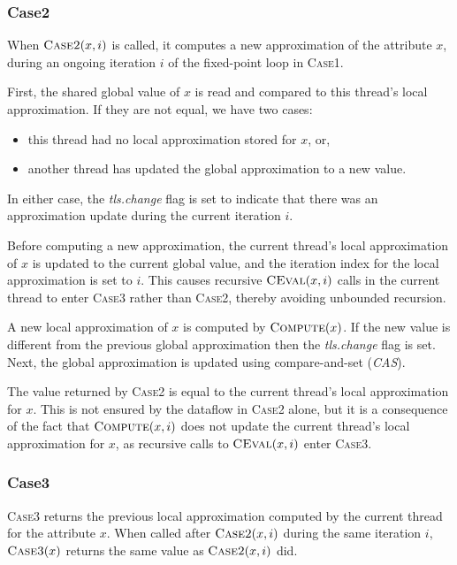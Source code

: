 {\subsubsection{Case2}

When $\textsc{Case2}(x, i)$ is called, it computes a new approximation of the attribute $x$,
during an ongoing iteration $i$ of the fixed-point loop in \textsc{Case1}.

First, the shared global value of $x$ is read and compared to this thread's local approximation.
If they are not equal, we have two cases:

\begin{itemize}
  \item this thread had no local approximation stored for $x$, or,
  \item another thread has updated the global approximation to a new value.
\end{itemize}

In either case, the \emph{tls.change} flag is set to indicate that there was an approximation update
during the current iteration $i$.

Before computing a new approximation, the current thread's local approximation of $x$ is updated to
the current global value, and the iteration index for the local approximation is set to $i$.  This
causes recursive $\textsc{CEval}(x, i)$ calls in the current thread to enter \textsc{Case3} rather
than \textsc{Case2}, thereby avoiding unbounded recursion.

A new local approximation of $x$ is computed by $\textsc{Compute}(x)$.
If the new value is
different from the previous global approximation then the \emph{tls.change} flag is set.
Next, the global approximation is updated using compare-and-set (\emph{CAS}).

The value returned by \textsc{Case2} is equal to the current thread's local approximation
for $x$. This is not ensured by the dataflow in \textsc{Case2} alone, but it is a consequence of the
fact that $\textsc{Compute}(x, i)$ does not update the current thread's local approximation for $x$,
as recursive calls to $\textsc{CEval}(x, i)$ enter \textsc{Case3}.


\subsubsection{Case3}

\textsc{Case3} returns the previous local approximation computed by
the current thread for the attribute $x$.
When called after $\textsc{Case2}(x, i)$
during the same iteration $i$, $\textsc{Case3}(x)$
returns the same value as $\textsc{Case2}(x, i)$ did.

}
